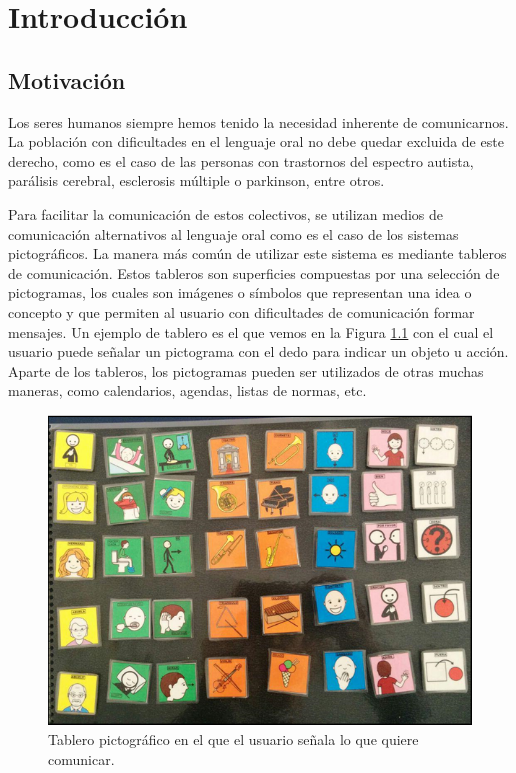 \chapter{Introducción}
\label{cap:introduccion}



\section{Motivación}
\label{cap1:sec:Motivacion}

Los seres humanos siempre hemos tenido la necesidad inherente de comunicarnos. La población con dificultades en el lenguaje oral no debe quedar excluida de este derecho, como es el caso de las personas con trastornos del espectro autista, parálisis cerebral, esclerosis múltiple o parkinson, entre otros. 

Para facilitar la comunicación de estos colectivos, se utilizan medios de comunicación
alternativos al lenguaje oral como es el caso de los sistemas pictográficos.
La  manera más común de utilizar este sistema es mediante tableros de comunicación. Estos tableros son superficies  compuestas por una selección de pictogramas, los cuales son imágenes o símbolos que representan una idea o concepto y que permiten al usuario con dificultades de comunicación formar mensajes. Un ejemplo de tablero es el que vemos en la Figura  \ref{fig:tablerofisico}  con el cual el usuario puede señalar un pictograma con el dedo para indicar un objeto u acción. Aparte de los tableros, los pictogramas pueden ser utilizados de otras muchas maneras, como calendarios, agendas, listas de normas, etc.



\begin{figure}[h!]
	\centering
	\includegraphics[width=0.7\linewidth]{Imagenes/Bitmap/tablerofisico}
	\caption{Tablero pictográfico en el que el usuario señala lo que quiere comunicar.}
	\label{fig:tablerofisico}
\end{figure}


